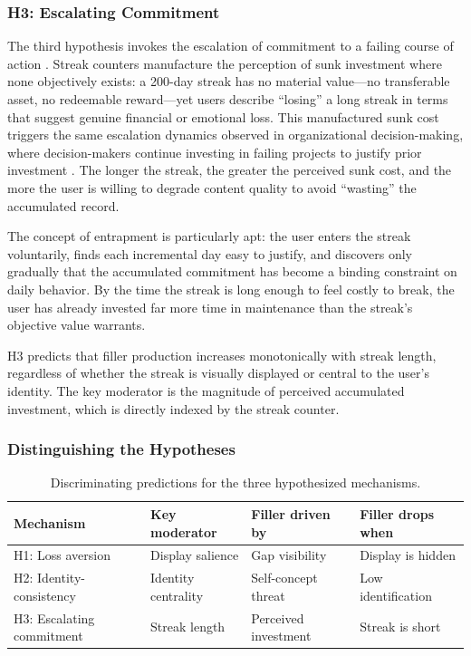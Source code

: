 \documentclass[12pt]{article}
\begin{document}
\subsubsection{H3: Escalating Commitment}
\label{sec:h3-escalating-commitment}

The third hypothesis invokes the escalation of commitment to a failing course of action \citep{Staw1976}. Streak counters manufacture the perception of sunk investment where none objectively exists: a 200-day streak has no material value---no transferable asset, no redeemable reward---yet users describe ``losing'' a long streak in terms that suggest genuine financial or emotional loss. This manufactured sunk cost triggers the same escalation dynamics observed in organizational decision-making, where decision-makers continue investing in failing projects to justify prior investment \citep{Brockner1992}. The longer the streak, the greater the perceived sunk cost, and the more the user is willing to degrade content quality to avoid ``wasting'' the accumulated record.

The concept of entrapment is particularly apt: the user enters the streak voluntarily, finds each incremental day easy to justify, and discovers only gradually that the accumulated commitment has become a binding constraint on daily behavior. By the time the streak is long enough to feel costly to break, the user has already invested far more time in maintenance than the streak's objective value warrants.

H3 predicts that filler production increases monotonically with streak length, regardless of whether the streak is visually displayed or central to the user's identity. The key moderator is the magnitude of perceived accumulated investment, which is directly indexed by the streak counter.

\subsubsection{Distinguishing the Hypotheses}
\label{sec:distinguishing-hypotheses}

\begin{table}[ht]
\centering
\caption{Discriminating predictions for the three hypothesized mechanisms.}
\label{tab:hypotheses}
\begin{tabular}{llll}
\toprule
Mechanism & Key moderator & Filler driven by & Filler drops when \\
\midrule
H1: Loss aversion & Display salience & Gap visibility & Display is hidden \\
H2: Identity-consistency & Identity centrality & Self-concept threat & Low identification \\
H3: Escalating commitment & Streak length & Perceived investment & Streak is short \\
\bottomrule
\end{tabular}
\end{table}
\end{document}

